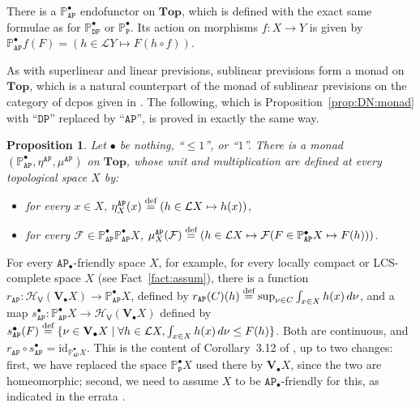 \documentclass[preprint,12pt]{elsarticle}
\newcommand\eqdef{\mathrel{\buildrel \text{def}\over=}}
\newcommand\Lform{\mathcal L}
\newcommand\identity[1]{\mathrm{id}_{#1}}
\newcommand\Pred{\mathbb{P}}
\newcommand\Angel{{\mathtt{A}}}
\newcommand\Demon{{\mathtt{D}}}
\newcommand\Nature{{\mathtt{P}}}
\newcommand\AN{{\Angel\Nature}}
\newcommand\DN{{\Demon\Nature}}
\newcommand\Hoare{{\mathcal H}}
\newcommand\Vt{\mathsf{V}}
\newcommand\HV{\Hoare_\Vt}
\newcommand\Val{{\mathbf V}}
\newcommand\Topcat{\mathbf{Top}}
\newtheorem{proposition}[theorem]{Proposition}
\begin{document}
There is a $\Pred_\AN^\bullet$ endofunctor on $\Topcat$, which is
defined with the exact same formulae as for $\Pred_\DN^\bullet$ or
$\Pred_\Nature^\bullet$.  Its action on morphisms $f \colon X \to Y$
is given by
$\Pred_\AN^\bullet f (F) = (h \in \Lform Y \mapsto F (h \circ f))$.

As with superlinear and linear previsions, sublinear previsions form a
monad on $\Topcat$, which is a natural counterpart of the monad of
sublinear previsions on the category of dcpos given in
\cite[Proposition~2]{Gou-csl07}.  The following, which is
Proposition~\ref{prop:DN:monad} with ``$\DN$'' replaced by ``$\AN$'',
is proved in exactly the same way.
\begin{proposition}
  \label{prop:AN:monad}
  Let $\bullet$ be nothing, ``$\leq 1$'', or ``$1$''.  There is a
  monad
  $(\Pred_\AN^\bullet, \allowbreak \eta^\AN, \allowbreak \mu^\AN)$ on
  $\Topcat$, whose unit and multiplication are defined at every
  topological space $X$ by:
  \begin{itemize}
  \item for every $x \in X$, $\eta^\AN_X (x) \eqdef (h \in \Lform X
    \mapsto h (x))$,
  \item for every
    $\mathcal F \in \Pred_\AN^\bullet {\Pred_\AN^\bullet X}$,
    $\mu^\AN_X (\mathcal F) \eqdef (h \in \Lform X \mapsto \mathcal F
    (F \in \Pred_\AN^\bullet X \mapsto F (h)))$.
  \end{itemize}
\end{proposition}

For every $\AN_\bullet$-friendly space $X$, for example, for every
locally compact or LCS-complete space $X$ (see Fact~\ref{fact:assum}),
there is a function
$r_\AN \colon \HV (\Val_\bullet X) \to \Pred_{\AN}^\bullet X$, defined
by
$r_\AN (C) (h) \eqdef \sup_{\nu \in C} \allowbreak \int_{x \in X} h
(x)\,d\nu$, and a map
$s_\AN^\bullet \colon \Pred_{\AN}^\bullet X \to \HV (\Val_\bullet X)$
defined by
$s_\AN^\bullet (F) \eqdef \{\nu \in \Val_\bullet X \mid \forall h \in
\Lform X, \int_{x \in X} h (x) \,d\nu \leq F (h)\}$.  Both are
continuous, and
$r_\AN \circ s_\AN^\bullet = \identity {\Pred_{\AN}^\bullet X}$.  This
is the content of Corollary~3.12 of \cite{JGL-mscs16}, up to two
changes: first, we have replaced the space $\Pred_\Nature^\bullet X$
used there by $\Val_\bullet X$, since the two are homeomorphic;
second, we need to assume $X$ to be $\AN_\bullet$-friendly for this,
as indicated in the errata \cite[Corollary~3.12, repaired]{JGL:mscs16:errata}.
\end{document}
